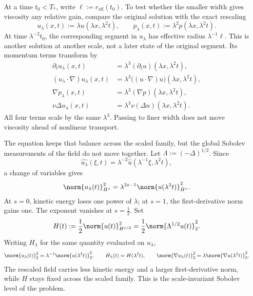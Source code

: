 
At a time \(t_0<T_*\), write \(\ell:=r_{\mathrm{eff}}(t_0)\). To test whether the smaller width gives viscosity any relative gain, compare the original solution with the exact \NavierStokes{} rescaling
\[
  u_\lambda(x,t)
  :=
  \lambda u(\lambda x,\lambda^2t),
  \qquad
  p_\lambda(x,t)
  :=
  \lambda^2p(\lambda x,\lambda^2t).
\]
At time \(\lambda^{-2}t_0\), the corresponding segment in \(u_\lambda\) has effective radius \(\lambda^{-1}\ell\). This is another solution at another scale, not a later state of the original segment. Its momentum terms transform by
\[
\begin{aligned}
  \partial_tu_\lambda(x,t)
  &=
  \lambda^3(\partial_tu)(\lambda x,\lambda^2t),
  \\
  (u_\lambda\cdot\nabla)u_\lambda(x,t)
  &=
  \lambda^3\bigl((u\cdot\nabla)u\bigr)(\lambda x,\lambda^2t),
  \\
  \nabla p_\lambda(x,t)
  &=
  \lambda^3(\nabla p)(\lambda x,\lambda^2t),
  \\
  \nu\Delta u_\lambda(x,t)
  &=
  \lambda^3\nu(\Delta u)(\lambda x,\lambda^2t).
\end{aligned}
\]
All four terms scale by the same \(\lambda^3\). Passing to finer width does not move viscosity ahead of nonlinear transport.


The equation keeps that balance across the scaled family, but the global Sobolev measurements of the field do not move together. Let \(\Lambda:=(-\Delta)^{1/2}\). Since
\[
  \widehat{u_\lambda}(\xi,t)
  =
  \lambda^{-2}\widehat u(\lambda^{-1}\xi,\lambda^2t),
\]
a change of variables gives
\[
  \norm{u_\lambda(t)}_{\dot H^s}^2
  =
  \lambda^{2s-1}
  \norm{u(\lambda^2t)}_{\dot H^s}^2.
\]
At \(s=0\), kinetic energy loses one power of \(\lambda\); at \(s=1\), the first-derivative norm gains one. The exponent vanishes at \(s=\tfrac12\). Set
\[
  H(t)
  :=
  \frac12\norm{u(t)}_{\dot H^{1/2}}^2
  =
  \frac12\norm{\Lambda^{1/2}u(t)}_2^2.
\]
Writing \(H_\lambda\) for the same quantity evaluated on \(u_\lambda\),
\[
  \norm{u_\lambda(t)}_2^2
  =
  \lambda^{-1}\norm{u(\lambda^2t)}_2^2,
  \qquad
  H_\lambda(t)=H(\lambda^2t),
  \qquad
  \norm{\nabla u_\lambda(t)}_2^2
  =
  \lambda\norm{\nabla u(\lambda^2t)}_2^2.
\]
The rescaled field carries less kinetic energy and a larger first-derivative norm, while \(H\) stays fixed across the scaled family. This is the scale-invariant Sobolev level of the problem.

